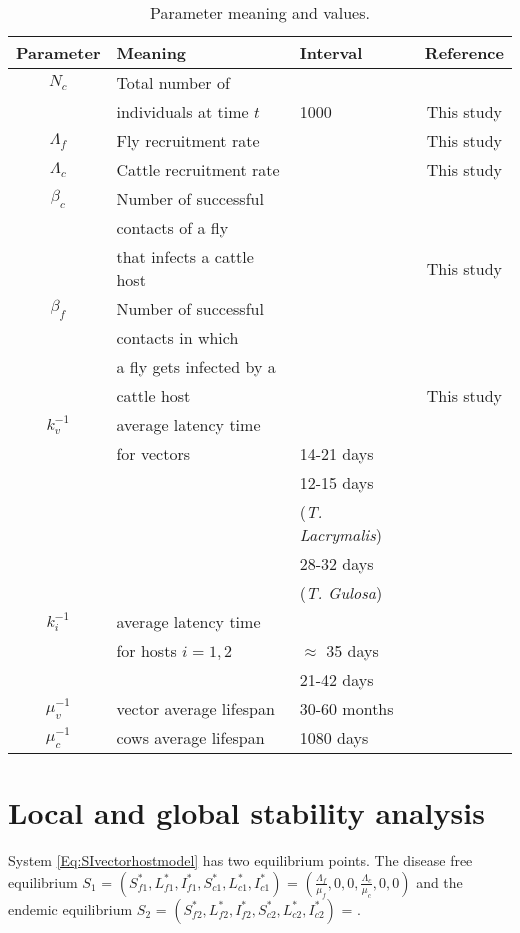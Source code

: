 \documentclass[preprint,12pt]{elsarticle}
\begin{document}
\begin{table*}[htb]\label{Table:Parameters}
	\begin{center}
        \begin{tabular}{cllc}
			\hline
			Parameter		&	Meaning & Interval & Reference
			\\
			\midrule
			$N_c$& Total number of &&\\
			&individuals at time $t$ &1000&This study
			\\
			$\Lambda_f$& Fly recruitment rate & & This study
			\\
			$\Lambda_c$& Cattle recruitment rate & & This study
			\\			
			$\beta_c$& Number of successful &&\\
			&contacts of a fly &&
				\\
			& that infects a cattle host &&This study
				\\
			$\beta_f$& Number of successful&&\\
			&contacts in which &&
				\\
			& a fly gets infected by a &&\\
			&cattle host &&This study
				\\
			$k_v^{-1}$	& average latency time &&\\
			&for vectors & 14-21 days &\cite{Otranto:bookchapter}
			\\
				& & 12-15 days &\\
				&&(\textit{T. Lacrymalis}) &\cite{Chanie:2014}
			\\
				& & 28-32 days&\\ 
				&&(\textit{T. Gulosa}) &\cite{Chanie:2014}
			\\
			$k_{i}^{-1}$
			&
				average latency time &&\\
				&for hosts $i=1,2$ & $\approx$ 35 days& \cite{Otranto:bookchapter}
			\\
			& & 21-42 days& \cite{Chanie:2014}
			\\			
			 $\mu_v^{-1}$	& vector average lifespan & 30-60 months&\cite{sanchez:1998}
			\\
			$\mu_c^{-1}$
			&
				cows average lifespan & 1080 days& \cite{FAOweb}
			\\
    		\bottomrule
		\end{tabular}
	\end{center}
	\caption{
		Parameter meaning and values.	}
\end{table*}


\section{Local and global stability analysis}
\noindent System \ref{Eq:SIvectorhostmodel} has two equilibrium points. The disease free equilibrium $S_1$ = $(S_{f1}^*,L_{f1}^*,I_{f1}^*,S_{c1}^*,L_{c1}^*,I_{c1}^*)$ = $(\frac{\Lambda_f}{\mu_f},0,0,\frac{\Lambda_c}{\mu_c},0,0)$ and the endemic equilibrium $S_2$ = $(S_{f2}^*,L_{f2}^*,I_{f2}^*,S_{c2}^*,L_{c2}^*,I_{c2}^*)$ = . 
\end{document}
